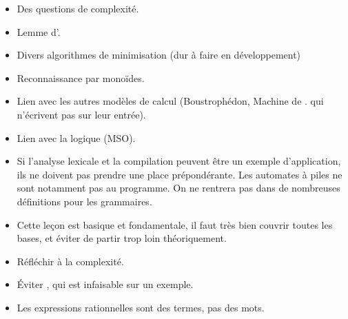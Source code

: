 \documentclass{agregfiche}
\begin{document}
\secidees
\begin{itemize}
	\item Des questions de complexité.
        \item Lemme d'.
	\item Divers algorithmes de minimisation (dur à faire en développement)
	\item Reconnaissance par monoïdes.
	\item Lien avec les autres modèles de calcul (Boustrophédon, Machine de .
          qui n'écrivent pas sur leur entrée).
	\item Lien avec la logique (MSO).
\end{itemize}


\secpieges

\begin{itemize}
\item Si l'analyse lexicale et la compilation peuvent être un exemple d'application, ils ne doivent pas prendre une place prépondérante. Les automates à piles ne sont notamment pas au programme. On ne rentrera pas dans de nombreuses définitions pour les grammaires.
\item Cette leçon est basique et fondamentale, il faut très bien couvrir toutes les bases, et éviter de partir trop loin théoriquement.
\item Réfléchir à la complexité.
\item Éviter  , qui est infaisable sur un exemple.
\item Les expressions rationnelles sont des termes, pas des mots.
\end{itemize}
\end{document}
